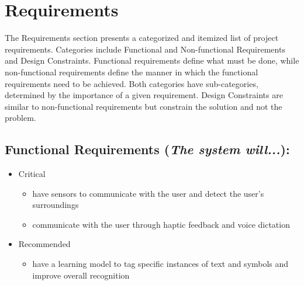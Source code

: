 \chapter{Requirements}
The Requirements section presents a categorized and itemized list of project requirements. Categories include Functional and Non-functional Requirements and Design Constraints. Functional requirements define what must be done, while non-functional requirements define the manner in which the functional requirements need to be achieved. Both categories have sub-categories, determined by the importance of a given requirement. Design Constraints are similar to non-functional requirements but constrain the solution and not the problem.
\section{Functional Requirements (\textit{The system will...}):}
\begin{itemize}
\item Critical
	\begin{itemize}
	\item have sensors to communicate with the user and detect the user’s surroundings
	\item communicate with the user through haptic feedback and voice dictation
    \end{itemize}
\item Recommended
	\begin{itemize}
	\item have a learning model to tag specific instances of text and symbols and improve overall recognition
	\end{itemize}
\end{itemize}

\pagebreak

